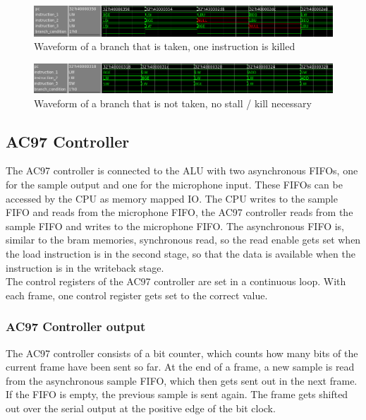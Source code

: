 \documentclass[12pt]{article}
\begin{document}
\begin{figure}[!hbtp]
\centering
\includegraphics[scale=0.35]{branch.png}
\caption{Waveform of a branch that is taken, one instruction is killed}
\label{fig:branch-taken}
\end{figure}


\begin{figure}[!hbtp]
\centering
\includegraphics[scale=0.38]{branch-not.png}
\caption{Waveform of a branch that is not taken, no stall / kill necessary}
\label{fig:branch-not-taken}
\end{figure}

\subsection{AC97 Controller}
The AC97 controller is connected to the ALU with two asynchronous FIFOs, one for the sample output and one for the microphone input. These FIFOs can be accessed by the CPU as memory mapped IO. The CPU writes to the sample FIFO and reads from the microphone FIFO, the AC97 controller reads from the sample FIFO and writes to the microphone FIFO. The asynchronous FIFO is, similar to the bram memories, synchronous read, so the read enable gets set when the load instruction is in the second stage, so that the data is available when the instruction is in the writeback stage.\\
The control registers of the AC97 controller are set in a continuous loop. With each frame, one control register gets set to the correct value.

\subsubsection{AC97 Controller output}
The AC97 controller consists of a bit counter, which counts how many bits of the current frame have been sent so far. At the end of a frame, a new sample is read from the asynchronous sample FIFO, which then gets sent out in the next frame. If the FIFO is empty, the previous sample is sent again. The frame gets shifted out over the serial output at the positive edge of the bit clock.
\end{document}
